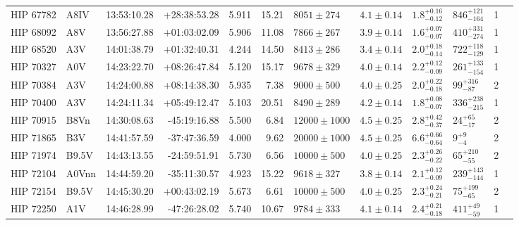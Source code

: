 \begin{tiny}
\begin{longtable}{|l|lrrrrllllll|}
   HIP 67782 &     A8IV &    13:53:10.28 &   +28:38:53.28 &   5.911 &     15.21 &    $8051 \pm 274$ &  $4.1 \pm 0.14$ &  $1.8^{+0.16}_{-0.12}$ &   $846^{+121}_{-164}$ &       1 \\
   HIP 68092 &      A8V &    13:56:27.88 &   +01:03:02.09 &   5.906 &     11.08 &    $7866 \pm 267$ &  $3.9 \pm 0.14$ &  $1.6^{+0.07}_{-0.07}$ &   $410^{+331}_{-274}$ &       1 \\
   HIP 68520 &      A3V &    14:01:38.79 &   +01:32:40.31 &   4.244 &     14.50 &    $8413 \pm 286$ &  $3.4 \pm 0.14$ &  $2.0^{+0.18}_{-0.14}$ &   $722^{+118}_{-129}$ &       1 \\
   HIP 70327 &      A0V &    14:23:22.70 &   +08:26:47.84 &   5.120 &     15.17 &    $9678 \pm 329$ &  $4.0 \pm 0.14$ &  $2.2^{+0.12}_{-0.09}$ &   $261^{+133}_{-154}$ &       1 \\
   HIP 70384 &      A3V &    14:24:00.88 &   +08:14:38.30 &   5.935 &      7.38 &    $9000 \pm 500$ &  $4.0 \pm 0.25$ &  $2.0^{+0.22}_{-0.18}$ &     $99^{+316}_{-87}$ &       2 \\
   HIP 70400 &      A3V &    14:24:11.34 &   +05:49:12.47 &   5.103 &     20.51 &    $8490 \pm 289$ &  $4.2 \pm 0.14$ &  $1.8^{+0.08}_{-0.07}$ &   $336^{+238}_{-215}$ &       1 \\
   HIP 70915 &     B8Vn &    14:30:08.63 &   -45:19:16.88 &   5.500 &      6.84 &  $12000 \pm 1000$ &  $4.5 \pm 0.25$ &  $2.8^{+0.42}_{-0.37}$ &      $24^{+65}_{-17}$ &       2 \\
   HIP 71865 &      B3V &    14:41:57.59 &   -37:47:36.59 &   4.000 &      9.62 &  $20000 \pm 1000$ &  $4.5 \pm 0.25$ &  $6.6^{+0.66}_{-0.64}$ &         $9^{+9}_{-4}$ &       2 \\
   HIP 71974 &    B9.5V &    14:43:13.55 &   -24:59:51.91 &   5.730 &      6.56 &   $10000 \pm 500$ &  $4.0 \pm 0.25$ &  $2.3^{+0.26}_{-0.22}$ &     $65^{+210}_{-55}$ &       2 \\
   HIP 72104 &    A0Vnn &    14:44:59.20 &   -35:11:30.57 &   4.923 &     15.22 &    $9618 \pm 327$ &  $3.8 \pm 0.14$ &  $2.1^{+0.12}_{-0.09}$ &   $239^{+143}_{-144}$ &       1 \\
   HIP 72154 &    B9.5V &    14:45:30.20 &   +00:43:02.19 &   5.673 &      6.61 &   $10000 \pm 500$ &  $4.0 \pm 0.25$ &  $2.3^{+0.24}_{-0.21}$ &     $75^{+199}_{-65}$ &       2 \\
   HIP 72250 &      A1V &    14:46:28.99 &   -47:26:28.02 &   5.740 &     10.67 &    $9784 \pm 333$ &  $4.1 \pm 0.14$ &  $2.4^{+0.21}_{-0.18}$ &     $411^{+49}_{-59}$ &       1 \\

\end{longtable}
\end{tiny}
